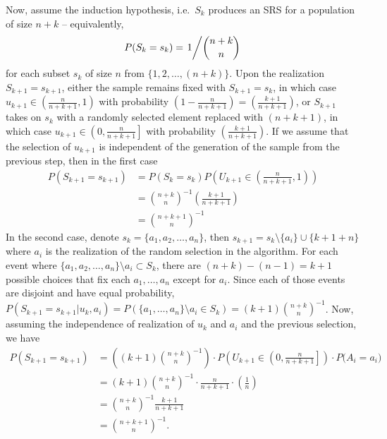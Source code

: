 \documentclass{homework}
\begin{document}
\begin{solution}
  Now, assume the induction hypothesis, i.e.~$S_k$ produces an SRS for a population of size $n+k$ -- equivalently,
  $$
   P(S_k = s_k) = \left. 1 \middle/ \binom{n+k}{n} \right.
  $$
  for each subset $s_k$ of size $n$ from $\{1,2,\dots,(n+k)\}$.
  Upon the realization $S_{k+1}=s_{k+1}$, either the sample remains fixed with $S_{k+1} = s_k$, in which case
   $u_{k+1} \in \left(\frac
  n{n+k+1},1\right)$ with probability $\left( 1 - \frac{n}{n+k+1}\right)=\left(
  \frac{k+1}{n+k+1} \right)$, or $S_{k+1}$ takes on $s_k$ with a randomly selected element replaced with
  $(n+k+1)$, in which case $u_{k+1} \in \left(0,\frac n{n+k+1}\right]$
  with probability $\left( \frac{k+1}{n+k+1} \right)$. If we assume that the
  selection of $u_{k+1}$ is independent of the generation of the sample from
  the previous step, then in the first case
  \begin{align*}
    P(S_{k+1} = s_{k+1}) 
    &= P(S_k = s_k) P\left(U_{k+1} \in \left(\frac n{n+k+1},1\right) \right) \\
    &=\binom {n+k}{n}^{-1} \left( \frac{k+1}{n+k+1} \right)\\
    &=\binom {n+k+1}n^{-1}
  \end{align*}
  In the second case, denote $s_k =\{a_1,a_2,\dots,a_n\}$, then $s_{k+1} =
  s_k\setminus\{a_i\}\cup\{k+1+n\}$ where $a_i$ is the realization of the
  random selection in the algorithm.  For each event where
  $\{a_1,a_2,\dots,a_n\}\setminus a_i \subset S_k$, there are $(n+k) - (n-1) = k+1$
  possible choices that fix each $a_1,\dots,a_n$ except for $a_i$.  Since each
  of those events are disjoint and have equal probability, $P(S_{k+1} = s_{k+1}
  | u_k,a_i) = P(\{a_1,\dots,a_n\}\setminus a_i \in S_k) = (k+1)\binom{n+k}n^{-1}$.  Now, assuming the independence
  of realization of $u_k$ and $a_i$ and the previous selection, we have
  \begin{align*}
    P(S_{k+1} = s_{k+1}) &= \left((k+1)\binom{n+k}n^{-1}\right)\cdot P\left(U_{k+1} \in \left(0,\frac n{n+k+1}\right] \right) \cdot P\Big( A_i = a_i \Big)\\
    &= (k+1)\binom{n+k}n^{-1}\cdot \frac n{n+k+1} \cdot \left( \frac 1n\right)\\
    &= \binom{n+k}{n}^{-1}\frac{k+1}{n+k+1}\\
    &=\binom {n+k+1}n^{-1}.
  \end{align*} 
\end{solution}
\end{document}
